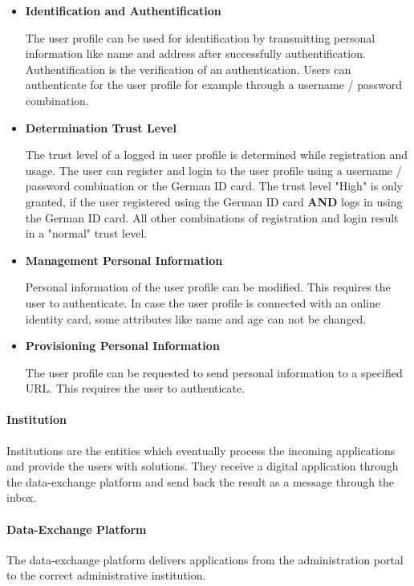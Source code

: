 \begin{itemize}
    \item \textbf{Identification and Authentification} \cite{dNRW:Anbindungsleitfaden}
    
    The user profile can be used for identification by transmitting personal information like name and address after successfully authentification. Authentification is the verification of an authentication. Users can authenticate for the user profile for example through a username / password combination.
    
    \item \textbf{Determination Trust Level} \cite{dNRW:Anbindungsleitfaden}
    
    The trust level of a logged in user profile is determined while registration and usage. The user can register and login to the user profile using a username / password combination or the German ID card. The trust level "High" is only granted, if the user registered using the German ID card \textbf{AND} logs in using the German ID card. All other combinations of registration and login result in a "normal" trust level.
    
    \item \textbf{Management Personal Information} \cite{dNRW:Anbindungsleitfaden} 
    
    Personal information of the user profile can be modified. This requires the user to authenticate. In case the user profile is connected with an online identity card, some attributes like name and age can not be changed.
    
    \item \textbf{Provisioning Personal Information} \cite{dNRW:Anbindungsleitfaden} \cite{dNRW:Schnittstellen}

    The user profile can be requested to send personal information to a specified URL. This requires the user to authenticate.
    
\end{itemize}

\paragraph{Institution}
Institutions are the entities which eventually process the incoming applications and provide the users with solutions. They receive a digital application through the data-exchange platform and send back the result as a message through the inbox.

\paragraph{Data-Exchange Platform}
The data-exchange platform delivers applications from the administration portal to the correct administrative institution.

